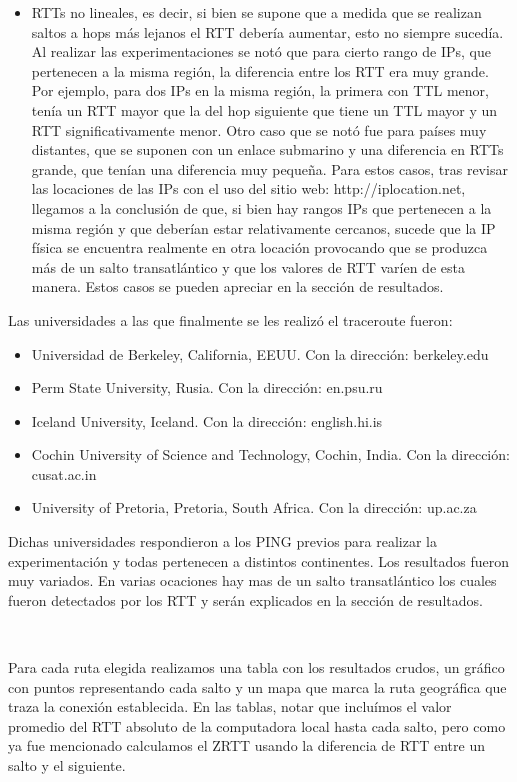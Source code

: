 \begin{itemize}
    \item RTTs no lineales, es decir, si bien se supone que a medida que se realizan saltos a hops más lejanos el RTT debería aumentar, esto no siempre sucedía. Al realizar las experimentaciones se notó que para cierto rango de IPs, que pertenecen a la misma región, la diferencia entre los RTT era muy grande. Por ejemplo, para dos IPs en la misma región, la primera con TTL menor, tenía un RTT mayor que la del hop siguiente que tiene un TTL mayor y un RTT significativamente menor. Otro caso que se notó fue para países muy distantes, que se suponen con un enlace submarino y una diferencia en RTTs grande, que tenían una diferencia muy pequeña. Para estos casos, tras revisar las locaciones de las IPs con el uso del sitio web: http://iplocation.net, llegamos a la conclusión de que, si bien hay rangos IPs que pertenecen a la misma región y que deberían estar relativamente cercanos, sucede que la IP física se encuentra realmente en otra locación provocando que se produzca más de un salto transatlántico y que los valores de RTT varíen de esta manera. Estos casos se pueden apreciar en la sección de resultados.
\end{itemize}

Las universidades a las que finalmente se les realizó el traceroute fueron:

\begin{itemize}
	\item Universidad de Berkeley, California, EEUU. Con la dirección: berkeley.edu
	\item Perm State University, Rusia. Con la dirección: en.psu.ru
	\item Iceland University, Iceland. Con la dirección: english.hi.is
	\item Cochin University of Science and Technology, Cochin, India. Con la dirección: cusat.ac.in
	\item University of Pretoria, Pretoria, South Africa. Con la dirección: up.ac.za
\end{itemize}

Dichas universidades respondieron a los PING previos para realizar la experimentación y todas pertenecen a distintos continentes. Los resultados fueron muy variados. En varias ocaciones hay mas de un salto transatlántico los cuales fueron detectados por los RTT y serán explicados en la sección de resultados.

~

Para cada ruta elegida realizamos una tabla con los resultados crudos, un gráfico con puntos representando cada salto y un mapa que marca la ruta geográfica que traza la conexión establecida. En las tablas, notar que incluímos el valor promedio del RTT absoluto de la computadora local hasta cada salto, pero como ya fue mencionado calculamos el ZRTT usando la diferencia de RTT entre un salto y el siguiente.

